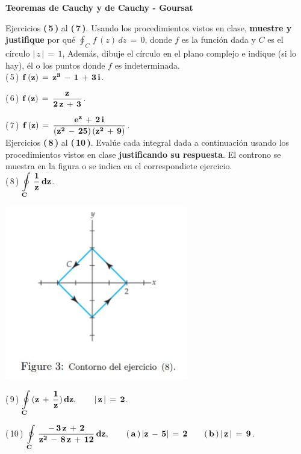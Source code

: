\documentclass[a4paper,11pt,openany]{book}
\begin{document}
\begin{center}
\textbf{Teoremas de Cauchy y de Cauchy - Goursat}
\end{center}

Ejercicios \textbf{(\,5\,)} al \textbf{(\,7\,)}. Usando los procedimientos vistos en clase, \textbf{muestre y justifique} por qué $\oint_{C}\,f\,(z)\,dz\,=\,0$, donde $f$ es la función dada y $C$ es el círculo $|\,z\,|\,=\,1$, Además, dibuje el círculo en el plano complejo e indique (si lo hay), él o los puntos donde $f$ es indeterminada.\\

\textcolor{ao(english)}{(\,5\,)} $\bf{f\,(z)\,=\,z^{3}\,-\,1\,+\,3\,i}$.

\textcolor{ao(english)}{(\,6\,)} $\bf{f\,(z)\,=\,\dfrac{z}{2\,z\,+\,3}}$.

\textcolor{ao(english)}{(\,7\,)} $\bf{f\,(z)\,=\,\dfrac{e^{z}\,+\,2\,i}{(z^{2}\,-\,25)\,(z^{2}\,+\,9)}}$.\\

Ejercicios \textbf{(\,8\,)} al \textbf{(\,10\,)}. Evalúe cada integral dada a continuación usando los procedimientos vistos en clase \textbf{justificando su respuesta}. El controno se muestra en la figura o se indica en el correspondiete ejercicio.\\

\textcolor{ao(english)}{(\,8\,)} $\bf{\displaystyle\oint\limits_{C}\,\dfrac{1}{z}\,dz}$.

\begin{center}
     \includegraphics[width=8cm]{figura-3.JPG}
\end{center}

\textcolor{ao(english)}{(\,9\,)} $\bf{\displaystyle\oint\limits_{C}\,(z\,+\,\dfrac{1}{z})\,dz}, \qquad |\,z\,|\,=\,2$.

\textcolor{ao(english)}{(\,10\,)} $\bf{\displaystyle\oint\limits_{C}\,\dfrac{-\,3\,z\,+\,2}{z^{2}\,-\,8\,z\,+\,12}\,dz}, \qquad (\,a\,)\,|z\,-\,5|\,=\,2 \qquad (\,b\,)\,|\,z\,|\,=\,9$.
\end{document}
